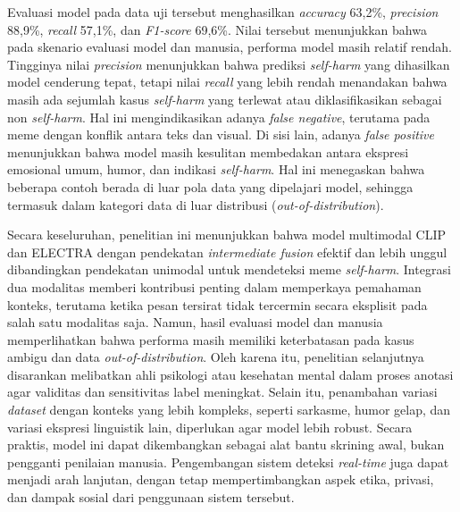 \begin{center}
	Evaluasi model pada data uji tersebut menghasilkan \textit{accuracy} 63,2\%, \textit{precision} 88,9\%, \textit{recall} 57,1\%, dan \textit{F1-score} 69,6\%. Nilai tersebut menunjukkan bahwa pada skenario evaluasi model dan manusia, performa model masih relatif rendah. Tingginya nilai \textit{precision} menunjukkan bahwa prediksi \textit{self-harm} yang dihasilkan model cenderung tepat, tetapi nilai \textit{recall} yang lebih rendah menandakan bahwa masih ada sejumlah kasus \textit{self-harm} yang terlewat atau diklasifikasikan sebagai non \textit{self-harm}. Hal ini mengindikasikan adanya \textit{false negative}, terutama pada meme dengan konflik antara teks dan visual. Di sisi lain, adanya \textit{false positive} menunjukkan bahwa model masih kesulitan membedakan antara ekspresi emosional umum, humor, dan indikasi \textit{self-harm}. Hal ini menegaskan bahwa beberapa contoh berada di luar pola data yang dipelajari model, sehingga termasuk dalam kategori data di luar distribusi (\textit{out-of-distribution}).

	Secara keseluruhan, penelitian ini menunjukkan bahwa model multimodal CLIP dan ELECTRA dengan pendekatan \textit{intermediate fusion} efektif dan lebih unggul dibandingkan pendekatan unimodal untuk mendeteksi meme \textit{self-harm}. Integrasi dua modalitas memberi kontribusi penting dalam memperkaya pemahaman konteks, terutama ketika pesan tersirat tidak tercermin secara eksplisit pada salah satu modalitas saja. Namun, hasil evaluasi model dan manusia memperlihatkan bahwa performa masih memiliki keterbatasan pada kasus ambigu dan data \textit{out-of-distribution}. Oleh karena itu, penelitian selanjutnya disarankan melibatkan ahli psikologi atau kesehatan mental dalam proses anotasi agar validitas dan sensitivitas label meningkat. Selain itu, penambahan variasi \textit{dataset} dengan konteks yang lebih kompleks, seperti sarkasme, humor gelap, dan variasi ekspresi linguistik lain, diperlukan agar model lebih robust. Secara praktis, model ini dapat dikembangkan sebagai alat bantu skrining awal, bukan pengganti penilaian manusia. Pengembangan sistem deteksi \textit{real-time} juga dapat menjadi arah lanjutan, dengan tetap mempertimbangkan aspek etika, privasi, dan dampak sosial dari penggunaan sistem tersebut.

	\vfill
	
\end{center}
\clearpage